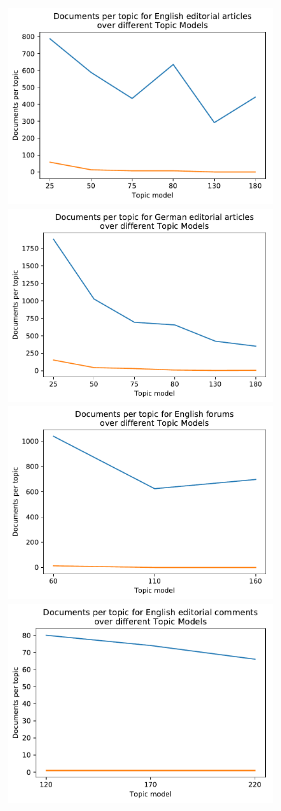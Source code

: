 \begin{figure}[t]
	\begin{minipage}{0.5\textwidth}
		\centering
		\includegraphics[width=7cm]{gfx/Eval_IC/English_Editorial_Doc_per_topic.pdf}
	\end{minipage}
	\begin{minipage}{0.5\textwidth}
		\centering
		\includegraphics[width=7cm]{gfx/Eval_IC/German_Editorial_Doc_per_topic.pdf}
	\end{minipage}%
	\begin{minipage}{0.5\textwidth}
		\centering
		\includegraphics[width=7cm]{gfx/Eval_IC/English_forums_Doc_per_topic.pdf}
	\end{minipage}
	\begin{minipage}{0.5\textwidth}
		\centering
		\includegraphics[width=7cm]{gfx/Eval_IC/Eng_comments_Doc_per_topic.pdf}

\end{minipage}
\end{figure}
